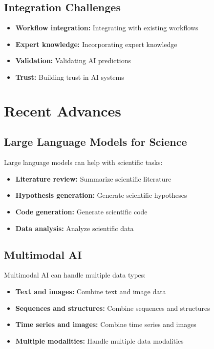 \subsection{Integration Challenges}

\begin{itemize}
    \item \textbf{Workflow integration:} Integrating with existing workflows
    \item \textbf{Expert knowledge:} Incorporating expert knowledge
    \item \textbf{Validation:} Validating AI predictions
    \item \textbf{Trust:} Building trust in AI systems
\end{itemize}

\section{Recent Advances}

\subsection{Large Language Models for Science}

Large language models can help with scientific tasks:
\begin{itemize}
    \item \textbf{Literature review:} Summarize scientific literature
    \item \textbf{Hypothesis generation:} Generate scientific hypotheses
    \item \textbf{Code generation:} Generate scientific code
    \item \textbf{Data analysis:} Analyze scientific data
\end{itemize}

\subsection{Multimodal AI}

Multimodal AI can handle multiple data types:
\begin{itemize}
    \item \textbf{Text and images:} Combine text and image data
    \item \textbf{Sequences and structures:} Combine sequences and structures
    \item \textbf{Time series and images:} Combine time series and images
    \item \textbf{Multiple modalities:} Handle multiple data modalities
\end{itemize}

